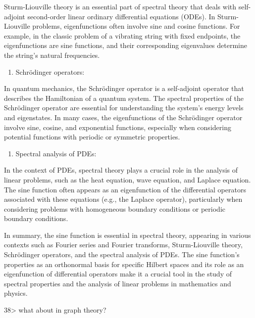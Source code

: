 \documentclass[
]{article}
\providecommand{\tightlist}{%
  \setlength{\itemsep}{0pt}\setlength{\parskip}{0pt}}
\begin{document}
Sturm-Liouville theory is an essential part of spectral theory that
deals with self-adjoint second-order linear ordinary differential
equations (ODEs). In Sturm-Liouville problems, eigenfunctions often
involve sine and cosine functions. For example, in the classic problem
of a vibrating string with fixed endpoints, the eigenfunctions are sine
functions, and their corresponding eigenvalues determine the string's
natural frequencies.

\begin{enumerate}
\def\labelenumi{\arabic{enumi}.}
\setcounter{enumi}{2}
\tightlist
\item
  Schrödinger operators:
\end{enumerate}

In quantum mechanics, the Schrödinger operator is a self-adjoint
operator that describes the Hamiltonian of a quantum system. The
spectral properties of the Schrödinger operator are essential for
understanding the system's energy levels and eigenstates. In many cases,
the eigenfunctions of the Schrödinger operator involve sine, cosine, and
exponential functions, especially when considering potential functions
with periodic or symmetric properties.

\begin{enumerate}
\def\labelenumi{\arabic{enumi}.}
\setcounter{enumi}{3}
\tightlist
\item
  Spectral analysis of PDEs:
\end{enumerate}

In the context of PDEs, spectral theory plays a crucial role in the
analysis of linear problems, such as the heat equation, wave equation,
and Laplace equation. The sine function often appears as an
eigenfunction of the differential operators associated with these
equations (e.g., the Laplace operator), particularly when considering
problems with homogeneous boundary conditions or periodic boundary
conditions.

In summary, the sine function is essential in spectral theory, appearing
in various contexts such as Fourier series and Fourier transforms,
Sturm-Liouville theory, Schrödinger operators, and the spectral analysis
of PDEs. The sine function's properties as an orthonormal basis for
specific Hilbert spaces and its role as an eigenfunction of differential
operators make it a crucial tool in the study of spectral properties and
the analysis of linear problems in mathematics and physics.

38\textgreater{} what about in graph theory?
\end{document}

